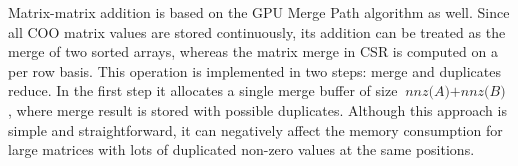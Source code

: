
Matrix-matrix addition is based on the GPU Merge Path algorithm as well.
Since all COO matrix values are stored continuously, 
its addition can be treated as the merge of two sorted arrays, 
whereas the matrix merge in CSR is computed on a per row basis. 
This operation is implemented in two steps: merge and duplicates reduce. 
In the first step it allocates a single merge buffer of size $\textit{nnz(A)} + \textit{nnz(B)}$, 
where merge result is stored with possible duplicates. 
Although this approach is simple and straightforward, it can negatively affect the memory consumption for large matrices with lots of duplicated non-zero values at the same positions.
